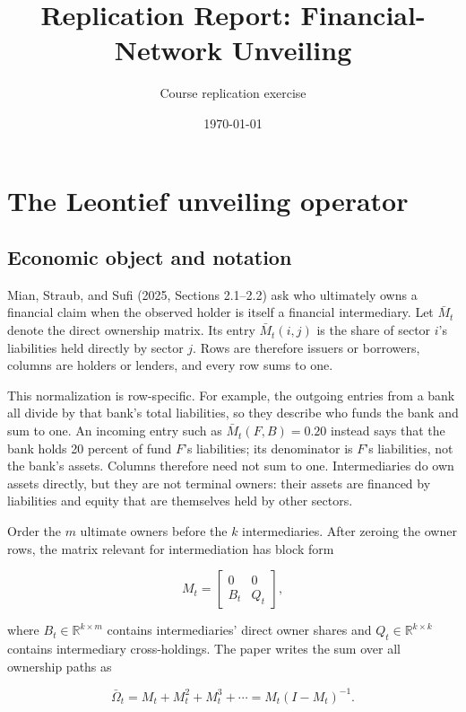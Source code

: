 \documentclass[11pt]{article}
\title{Replication Report: Financial-Network Unveiling}
\author{Course replication exercise}
\date{\today}
\newcommand{\matM}{\bar M}
\begin{document}
\maketitle

\section{The Leontief unveiling operator}
\label{sec:leontief}

\subsection{Economic object and notation}

Mian, Straub, and Sufi (2025, Sections 2.1--2.2) ask who ultimately owns a
financial claim when the observed holder is itself a financial intermediary.
Let $\matM_t$ denote the direct ownership matrix. Its entry $\matM_t(i,j)$ is
the share of sector $i$'s liabilities held directly by sector $j$. Rows are
therefore issuers or borrowers, columns are holders or lenders, and every row
sums to one.

This normalization is row-specific. For example, the outgoing entries from a
bank all divide by that bank's total liabilities, so they describe who funds
the bank and sum to one. An incoming entry such as $\matM_t(F,B)=0.20$ instead
says that the bank holds 20 percent of fund $F$'s liabilities; its denominator
is $F$'s liabilities, not the bank's assets. Columns therefore need not sum to
one. Intermediaries do own assets directly, but they are not terminal owners:
their assets are financed by liabilities and equity that are themselves held
by other sectors.

Order the $m$ ultimate owners before the $k$ intermediaries. After zeroing the
owner rows, the matrix relevant for intermediation has block form

\begin{equation}
  M_t=
  \begin{bmatrix}
    0   & 0   \\
    B_t & Q_t
  \end{bmatrix},
\end{equation}

where $B_t\in\mathbb{R}^{k\times m}$ contains intermediaries' direct owner
shares and $Q_t\in\mathbb{R}^{k\times k}$ contains intermediary
cross-holdings. The paper writes the sum over all ownership paths as

\begin{equation}
  \bar\Omega_t=M_t+M_t^2+M_t^3+\cdots=M_t(I-M_t)^{-1}.
  \label{eq:paper-leontief}
\end{equation}
\end{document}
